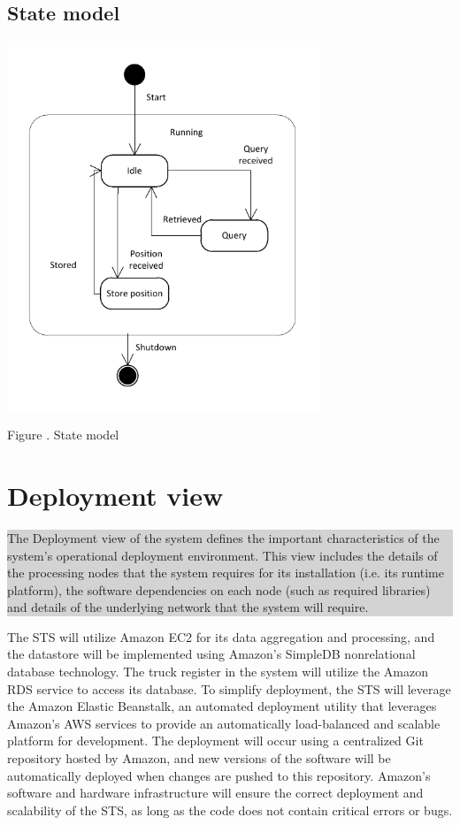 \documentclass[a4paper,11pt]{report}
\newcommand{\instructions}[1]{
  \noindent\colorbox{lightgray}{%
    \parbox{\linewidth}{%
      #1
    }%
  }%
 \vspace{0.1cm}
}
\newcommand{\mycaption}[1]{
  \addtocounter{figures}{1}
  Figure \arabic{figures}. #1
}
\begin{document}
\subsection{State model}
\label{sec:state-model}


\begin{center}
  \includegraphics[width=0.7\textwidth]{figures/state_model}\\
  \mycaption{State model}
\end{center}


\section{Deployment view}
\label{sec:deployment-view}

\instructions{
The Deployment view of the system defines the important
characteristics of the system’s operational deployment
environment. This view includes the details of the processing nodes
that the system requires for its installation (i.e. its runtime
platform), the software dependencies on each node (such as required
libraries) and details of the underlying network that the system will
require.
}

The STS will utilize Amazon EC2 for its data aggregation and processing, and
the datastore will be implemented using Amazon's SimpleDB nonrelational
database technology. The truck register in the system will utilize the Amazon
RDS service to access its database. To simplify deployment, the STS will
leverage the Amazon Elastic Beanstalk, an automated deployment utility that
leverages Amazon's AWS services to provide an automatically load-balanced and
scalable platform for development. The deployment will occur using a
centralized Git repository hosted by Amazon, and new versions of the software
will be automatically deployed when changes are pushed to this repository.
Amazon's software and hardware infrastructure will ensure the correct
deployment and scalability of the STS, as long as the code does not contain
critical errors or bugs.
\end{document}
